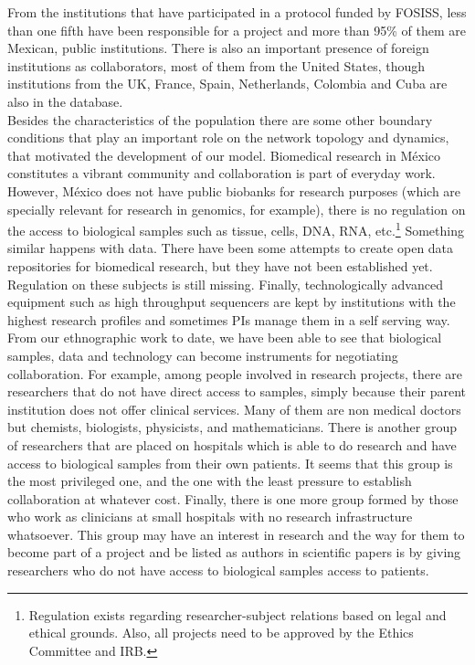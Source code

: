 \documentclass{bmcart}
\begin{document}
From the institutions that have participated in a protocol funded by FOSISS,
less than one fifth have been responsible for a project and more than 95\% of
them are Mexican, public institutions. There is also an important presence of
foreign institutions as collaborators, most of them from the United States,
though institutions from the UK, France, Spain, Netherlands, Colombia and Cuba
are also in the database.\\ 

Besides the characteristics of the population there are some other boundary
conditions that play an important role on the network topology and dynamics,
that motivated the development of our model. Biomedical research in M\'exico
constitutes a vibrant community and collaboration is part of everyday
work. However, M\'exico does not have public biobanks for research purposes
(which are specially relevant for research in genomics, for example), there is
no regulation on the access to biological samples such as tissue, cells, DNA,
RNA, etc.\footnote{Regulation exists regarding researcher-subject relations
  based on legal and ethical grounds. Also, all projects need to be approved by
  the Ethics Committee and IRB.} Something similar happens with data. There have
been some attempts to create open data repositories for biomedical research, but
they have not been established yet. Regulation on these subjects is still
missing. Finally, technologically advanced equipment such as high throughput sequencers
are kept by institutions with the highest research
profiles and sometimes PIs manage them in a self serving way.\\  

From our ethnographic work to date, we have been able to see that
biological samples, data and technology can become instruments for negotiating
collaboration. For example, among people involved in research projects, there
are researchers that do not have direct access to samples, simply because their
parent institution does not offer clinical services. Many of them are non medical
doctors but chemists, biologists, physicists, and mathematicians. There is
another group of researchers that are placed on hospitals which is able to do
research and have access to biological samples from their own patients. It seems
that this group is the most privileged one, and the one with the least pressure to establish
collaboration at whatever cost. Finally, there is one more group formed by those
who work as clinicians at small hospitals with no research infrastructure
whatsoever. This group may have an interest in research and the way for them to
become part of a project and be listed as authors in scientific papers is by
giving researchers who do not have access to biological samples access to
patients.\\
\end{document}
